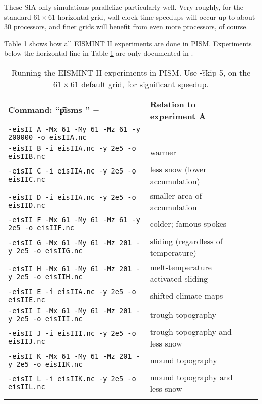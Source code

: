 These SIA-only simulations parallelize particularly well.  Very roughly, for the standard $61\times 61$ horizontal grid, wall-clock-time speedups will occur up to about 30 processors, and finer grids will benefit from even more processors, of course.

Table \ref{tab:eisII} shows how all EISMINT II experiments are done in PISM.  Experiments below the horizontal line in Table \ref{tab:eisII} are only documented in \cite{EISIIdescribe}.

\begin{table}[ht]
\centering
\caption{Running the EISMINT II experiments in PISM.  Use \t{-skip 5}, on the $61\times 61$ default grid, for significant speedup.}\label{tab:eisII}
\small
\begin{tabular}{@{}llll}\toprule
\textbf{Command: ``\t{pisms }'' $+$} & \textbf{Relation to experiment A} \\ \midrule
\texttt{-eisII A -Mx 61 -My 61 -Mz 61 -y 200000 -o eisIIA.nc} & \\
\texttt{-eisII B -i eisIIA.nc -y 2e5 -o eisIIB.nc} & warmer \\
\texttt{-eisII C -i eisIIA.nc -y 2e5 -o eisIIC.nc} & less snow (lower accumulation)\\
\texttt{-eisII D -i eisIIA.nc -y 2e5 -o eisIID.nc} & smaller area of accumulation \\
\texttt{-eisII F -Mx 61 -My 61 -Mz 61 -y 2e5 -o eisIIF.nc} & colder; famous spokes \cite{BBL} \\
\texttt{-eisII G -Mx 61 -My 61 -Mz 201 -y 2e5 -o eisIIG.nc} & sliding (regardless of temperature) \\
\texttt{-eisII H -Mx 61 -My 61 -Mz 201 -y 2e5 -o eisIIH.nc} & melt-temperature activated sliding \\ \midrule
\texttt{-eisII E -i eisIIA.nc -y 2e5 -o eisIIE.nc} & shifted climate maps \\
\texttt{-eisII I -Mx 61 -My 61 -Mz 201 -y 2e5 -o eisIII.nc} & trough topography \\
\texttt{-eisII J -i eisIII.nc -y 2e5 -o eisIIJ.nc} & trough topography and less snow \\
\texttt{-eisII K -Mx 61 -My 61 -Mz 201 -y 2e5 -o eisIIK.nc} & mound topography \\
\texttt{-eisII L -i eisIIK.nc -y 2e5 -o eisIIL.nc} & mound topography and less snow \\
\bottomrule\normalsize
\end{tabular}\end{table}

